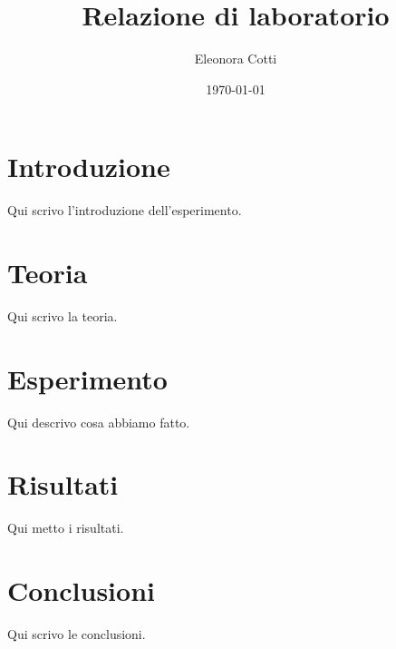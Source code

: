 \documentclass{article}
\title{Relazione di laboratorio}
\author{Eleonora Cotti}
\date{\today}
\begin{document}
	
	\maketitle
	
	\section{Introduzione}
	
	Qui scrivo l'introduzione dell'esperimento.
	
	\section{Teoria}
	
	Qui scrivo la teoria.
	
	\section{Esperimento}
	
	Qui descrivo cosa abbiamo fatto.
	
	\section{Risultati}
	
	Qui metto i risultati.
	
	\section{Conclusioni}
	
	Qui scrivo le conclusioni.
	
\end{document}
